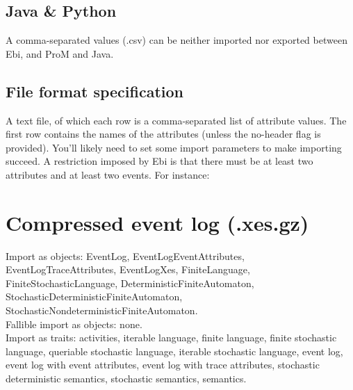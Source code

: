 {\subsection*{Java \& Python}
A comma-separated values (.csv) can be neither imported nor exported between Ebi, and ProM and Java.
\subsection*{File format specification}A text file, of which each row is a comma-separated list of attribute values. 
    The first row contains the names of the attributes (unless the no-header flag is provided).
    You'll likely need to set some import parameters to make importing succeed.
    A restriction imposed by Ebi is that there must be at least two attributes and at least two events.
    For instance:
    
\clearpage
\section{Compressed event log (.xes.gz)}
\label{filehandler:compressed event log}
Import as objects: EventLog, EventLogEventAttributes, EventLogTraceAttributes, EventLogXes, FiniteLanguage, FiniteStochasticLanguage, DeterministicFiniteAutomaton, StochasticDeterministicFiniteAutomaton, StochasticNondeterministicFiniteAutomaton.
\\Fallible import as objects: none.
\\Import as traits: activities, iterable language, finite language, finite stochastic language, queriable stochastic language, iterable stochastic language, event log, event log with event attributes, event log with trace attributes, stochastic deterministic semantics, stochastic semantics, semantics.
}
